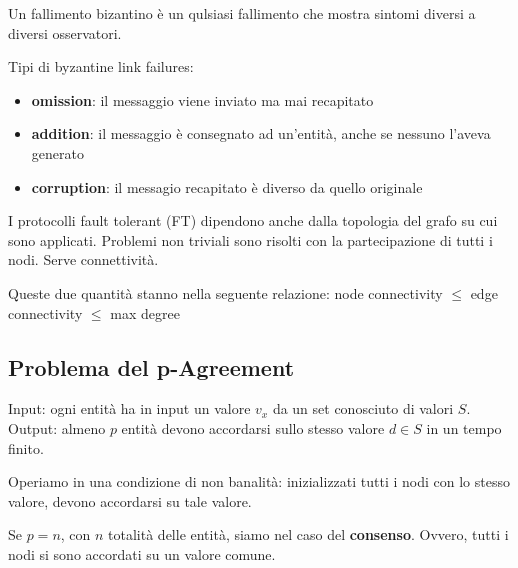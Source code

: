 Un fallimento bizantino è un qulsiasi fallimento che mostra sintomi diversi a diversi osservatori.

Tipi di byzantine link failures:
\begin{itemize}
  \item \textbf{omission}: il messaggio viene inviato ma mai recapitato
  \item \textbf{addition}: il messaggio è consegnato ad un'entità, anche se nessuno l'aveva generato
  \item \textbf{corruption}: il messagio recapitato è diverso da quello originale
\end{itemize}

I protocolli fault tolerant (FT) dipendono anche dalla topologia del grafo su cui sono applicati.
Problemi non triviali sono risolti con la partecipazione di tutti i nodi. Serve connettività.


Queste due quantità stanno nella seguente relazione: node connectivity $\leq$ edge connectivity $\leq$ max degree



\subsection{Problema del p-Agreement}
Input: ogni entità ha in input un valore $v_x$ da un set conosciuto di valori $S$.\\
Output: almeno $p$ entità devono accordarsi sullo stesso valore $d \in S$ in un tempo finito.

Operiamo in una condizione di non banalità: inizializzati tutti i nodi con lo stesso valore, devono accordarsi su tale valore.

Se $p = n$, con $n$ totalità delle entità, siamo nel caso del \textbf{consenso}.
Ovvero, tutti i nodi si sono accordati su un valore comune.


